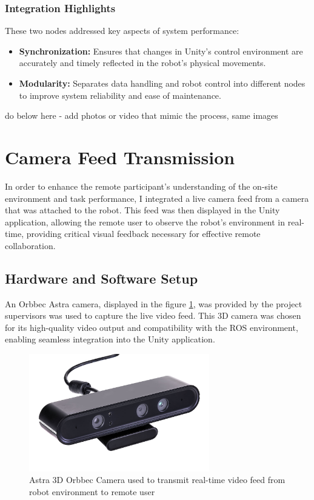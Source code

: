     
    \subsubsection{Integration Highlights}
    These two nodes addressed key aspects of system performance:
    \begin{itemize}
        \item \textbf{Synchronization:} Ensures that changes in Unity’s control environment are accurately and timely reflected in the robot's physical movements.
        \item \textbf{Modularity:} Separates data handling and robot control into different nodes to improve system reliability and ease of maintenance.
    \end{itemize}




    
    do below here - add photos or video that mimic the process, same images
    
    \section{Camera Feed Transmission}

    In order to enhance the remote participant's understanding of the on-site environment and task performance, I integrated a live camera feed from a camera that was attached to the robot. This feed was then displayed in the Unity application, allowing the remote user to observe the robot's environment in real-time, providing critical visual feedback necessary for effective remote collaboration.

    \subsection{Hardware and Software Setup}
    An Orbbec Astra camera, displayed in the figure \ref{fig:astra-camera}, was provided by the project supervisors was used to capture the live video feed. This 3D camera was chosen for its high-quality video output and compatibility with the ROS environment, enabling seamless integration into the Unity application.
    
    \begin{figure}[h]
        \centering
        \includegraphics[width=0.7\textwidth]{figs/AstraSeries_3.jpg}
        \caption{Astra 3D Orbbec Camera used to transmit real-time video feed from robot environment to remote user}
        \label{fig:astra-camera}
    \end{figure}
    \FloatBarrier

